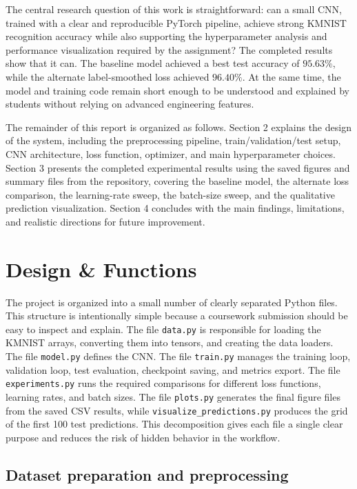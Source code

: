 \documentclass[conference]{IEEEtran}
\begin{document}
The central research question of this work is straightforward: can a small CNN, trained with a clear and reproducible PyTorch pipeline, achieve strong KMNIST recognition accuracy while also supporting the hyperparameter analysis and performance visualization required by the assignment? The completed results show that it can. The baseline model achieved a best test accuracy of $95.63\%$, while the alternate label-smoothed loss achieved $96.40\%$. At the same time, the model and training code remain short enough to be understood and explained by students without relying on advanced engineering features.

The remainder of this report is organized as follows. Section 2 explains the design of the system, including the preprocessing pipeline, train/validation/test setup, CNN architecture, loss function, optimizer, and main hyperparameter choices. Section 3 presents the completed experimental results using the saved figures and summary files from the repository, covering the baseline model, the alternate loss comparison, the learning-rate sweep, the batch-size sweep, and the qualitative prediction visualization. Section 4 concludes with the main findings, limitations, and realistic directions for future improvement.

\section{Design \& Functions}

The project is organized into a small number of clearly separated Python files. This structure is intentionally simple because a coursework submission should be easy to inspect and explain. The file \texttt{data.py} is responsible for loading the KMNIST arrays, converting them into tensors, and creating the data loaders. The file \texttt{model.py} defines the CNN. The file \texttt{train.py} manages the training loop, validation loop, test evaluation, checkpoint saving, and metrics export. The file \texttt{experiments.py} runs the required comparisons for different loss functions, learning rates, and batch sizes. The file \texttt{plots.py} generates the final figure files from the saved CSV results, while \texttt{visualize\_predictions.py} produces the grid of the first 100 test predictions. This decomposition gives each file a single clear purpose and reduces the risk of hidden behavior in the workflow.

\subsection{Dataset preparation and preprocessing}
\end{document}
